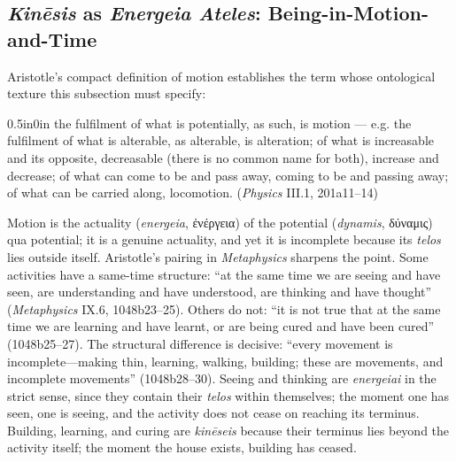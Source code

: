 \documentclass{article}
\newcommand{\gk}[1]{{\greekfont #1}}
\begin{document}
\subsection{\textit{Kinēsis} as \textit{Energeia Ateles}: Being-in-Motion-and-Time}

Aristotle's compact definition of motion establishes the term whose ontological texture this subsection must specify:
\begin{adjustwidth}{0.5in}{0in}
the fulfilment of what is potentially, as such, is motion --- e.g. the fulfilment of what is alterable, as alterable, is alteration; of what is increasable and its opposite, decreasable (there is no common name for both), increase and decrease; of what can come to be and pass away, coming to be and passing away; of what can be carried along, locomotion. (\textit{Physics} III.1, 201a11--14)
\end{adjustwidth}
Motion is the actuality (\textit{energeia}, \gk{ἐνέργεια}) of the potential (\textit{dynamis}, \gk{δύναμις}) qua potential; it is a genuine actuality, and yet it is incomplete because its \textit{telos} lies outside itself. Aristotle's pairing in \textit{Metaphysics} sharpens the point. Some activities have a same-time structure: ``at the same time we are seeing and have seen, are understanding and have understood, are thinking and have thought'' (\textit{Metaphysics} IX.6, 1048b23--25). Others do not: ``it is not true that at the same time we are learning and have learnt, or are being cured and have been cured'' (1048b25--27). The structural difference is decisive: ``every movement is incomplete---making thin, learning, walking, building; these are movements, and incomplete movements'' (1048b28--30). Seeing and thinking are \textit{energeiai} in the strict sense, since they contain their \textit{telos} within themselves; the moment one has seen, one is seeing, and the activity does not cease on reaching its terminus. Building, learning, and curing are \textit{kinēseis} because their terminus lies beyond the activity itself; the moment the house exists, building has ceased.
\end{document}
